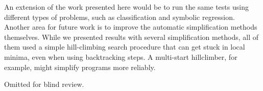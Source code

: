 An extension of the work presented here would be to run the same tests using different types of problems, such as classification and symbolic regression. Another area for future work is to improve the automatic simplification methods themselves. While we presented results with several simplification methods, all of them used a simple hill-climbing search procedure that can get stuck in local minima, even when using backtracking steps. A multi-start hillclimber, for example, might simplify programs more reliably.


\begin{acks}
  
Omitted for blind review.

\end{acks}
